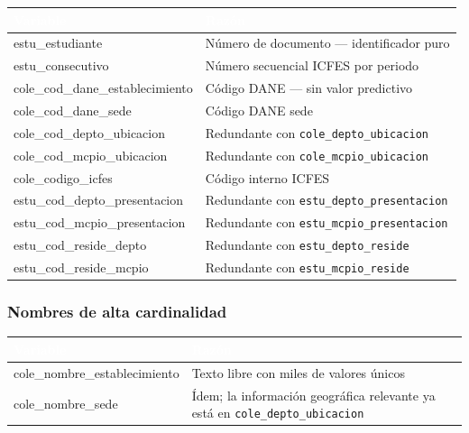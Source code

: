 \documentclass[12pt, a4paper]{article}
\newcommand{\thead}[1]{\cellcolor{tabheader}\textcolor{white}{\textbf{#1}}}
\begin{document}
\vspace{4pt}
\begin{tabularx}{\textwidth}{>{\ttfamily}l X}
  \toprule
  \thead{Variable} & \thead{Razón} \\
  \midrule
  \rowcolor{rowalt}
  estu\_estudiante                & Número de documento — identificador puro \\
  estu\_consecutivo               & Número secuencial ICFES por periodo \\
  \rowcolor{rowalt}
  cole\_cod\_dane\_establecimiento & Código DANE — sin valor predictivo \\
  cole\_cod\_dane\_sede           & Código DANE sede \\
  \rowcolor{rowalt}
  cole\_cod\_depto\_ubicacion     & Redundante con \texttt{cole\_depto\_ubicacion} \\
  cole\_cod\_mcpio\_ubicacion     & Redundante con \texttt{cole\_mcpio\_ubicacion} \\
  \rowcolor{rowalt}
  cole\_codigo\_icfes             & Código interno ICFES \\
  estu\_cod\_depto\_presentacion  & Redundante con \texttt{estu\_depto\_presentacion} \\
  \rowcolor{rowalt}
  estu\_cod\_mcpio\_presentacion  & Redundante con \texttt{estu\_mcpio\_presentacion} \\
  estu\_cod\_reside\_depto        & Redundante con \texttt{estu\_depto\_reside} \\
  \rowcolor{rowalt}
  estu\_cod\_reside\_mcpio        & Redundante con \texttt{estu\_mcpio\_reside} \\
  \bottomrule
\end{tabularx}

\subsubsection{Nombres de alta cardinalidad}

\vspace{4pt}
\begin{tabularx}{\textwidth}{>{\ttfamily}l X}
  \toprule
  \thead{Variable} & \thead{Razón} \\
  \midrule
  \rowcolor{rowalt}
  cole\_nombre\_establecimiento & Texto libre con miles de valores únicos \\
  cole\_nombre\_sede            & Ídem; la información geográfica relevante
                                  ya está en \texttt{cole\_depto\_ubicacion} \\
  \bottomrule
\end{tabularx}
\end{document}

